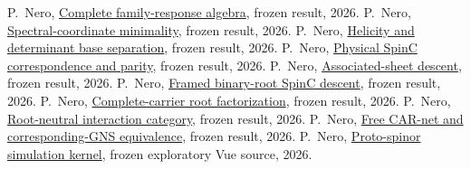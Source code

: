 \documentclass[11pt]{article}
\newcommand{\frozenresult}[2]{\href{https://github.com/PeterNero/mtt-results-repro/blob/f141a20ea23c5c3ff19cc2161c0e226e29ade8a7/release/results/#1/artifact.json}{#2}}
\begin{document}
\begin{thebibliography}{99}
 P.~Nero, \frozenresult{q79_superconnection_04f}{Complete family-response algebra}, frozen result, 2026.
 P.~Nero, \frozenresult{q79_superconnection_04g}{Spectral-coordinate minimality}, frozen result, 2026.
 P.~Nero, \frozenresult{q79_superconnection_04h}{Helicity and determinant base separation}, frozen result, 2026.
 P.~Nero, \frozenresult{q79_superconnection_04i}{Physical SpinC correspondence and parity}, frozen result, 2026.
 P.~Nero, \frozenresult{q79_superconnection_04j}{Associated-sheet descent}, frozen result, 2026.
 P.~Nero, \frozenresult{q79_superconnection_04k}{Framed binary-root SpinC descent}, frozen result, 2026.
 P.~Nero, \frozenresult{q79_superconnection_04l}{Complete-carrier root factorization}, frozen result, 2026.
 P.~Nero, \frozenresult{q79_superconnection_04m}{Root-neutral interaction category}, frozen result, 2026.
 P.~Nero, \frozenresult{q79_superconnection_04n}{Free CAR-net and corresponding-GNS equivalence}, frozen result, 2026.
 P.~Nero, \href{https://github.com/PeterNero/mtt-results-repro/blob/f141a20ea23c5c3ff19cc2161c0e226e29ade8a7/release/results/protospinor_simulation_kernel/artifact.vue}{Proto-spinor simulation kernel}, frozen exploratory Vue source, 2026.
\end{thebibliography}
\end{document}
